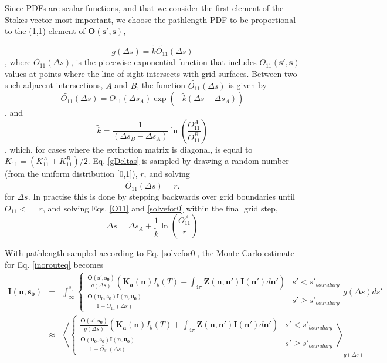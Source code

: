 Since PDFs are scalar functions, and that we consider the first element of the
Stokes vector most important, we choose the pathlength PDF to be proportional to the
(1,1) element of $\mathbf{O(s',s)}$,

\begin{equation}
g(\Delta s)=\tilde{k}\tilde{O_{11}}(\Delta s)
\label{gDeltas}
\end{equation}
, where $\tilde{O_{11}}(\Delta s)$, is the piecewise exponential
function that includes $O_{11}(\mathbf{s',s})$ values at points
where the line of sight intersects with grid surfaces.
Between two such adjacent intersections, $A$ and $B$, the function
$\tilde{O_{11}}(\Delta s)$ is given by
\begin{equation}
\tilde{O_{11}}(\Delta s)=O_{11}(\Delta s_A)\exp\left(-\tilde{k}\left(\Delta s-\Delta
s_A\right)\right)
\label{O11}
\end{equation}
, and
\begin{equation}
\tilde{k}=\frac{1}{\left(\Delta s_B-\Delta s_A\right)}
\ln\left(\frac{O_{11}^A}{O_{11}^B}\right)
\end{equation}
, which, for cases where the extinction matrix is diagonal, is equal to $K_{11}=(K_{11}^A+K_{11}^B)/2$.
Eq. \ref{gDeltas} is sampled by drawing a random number (from the uniform distribution [0,1]), $r$, and solving 
\begin{equation}
\tilde{O_{11}}(\Delta s)=r.
\label{solvefor0}
\end{equation}
for $\Delta s$.  In practise this is done by stepping backwards over
grid boundaries until $O_{11}<=r$, and solving Eqs. \ref{O11} and
\ref{solvefor0} within the final grid step,
\begin{equation}
\Delta s=\Delta s_A+\frac{1}{\tilde{k}}\ln\left(\frac{O_{11}^A}{r}\right)
\end{equation}

With pathlength sampled according to Eq. \ref{solvefor0}, the Monte
Carlo estimate for Eq. \ref{inorouteq} becomes
\begin{eqnarray}
\mathbf{I(n,s_0)}&=&\int^{s_0}_\infty\left\{\begin{array}{rl}
\frac{\mathbf{O(s',s_0)}}{g(\Delta s)}\left(\mathbf{K_a(n)}I_b(T)
+\int_{4\pi}\mathbf{Z(n,n')}\mathbf{I(n')}d\mathbf{n'}\right) & s'< s'_{boundary} \\
\frac{\mathbf{O(u_0,s_0)I(n,u_0)}}{1-\tilde{O_{11}}(\Delta s)} & s'\ge s'_{boundary}
\end{array}g(\Delta s)ds'\right.\nonumber\\
&\approx&\left\langle\left\{\begin{array}{rl}
\frac{\mathbf{O(s',s_0)}}{g(\Delta s)}\left(\mathbf{K_a(n)}I_b(T)
+\int_{4\pi}\mathbf{Z(n,n')}\mathbf{I(n')}d\mathbf{n'}\right) & s'< s'_{boundary} \\
\frac{\mathbf{O(u_0,s_0)I(n,u_0)}}{1-\tilde{O_{11}}(\Delta s)} & s'\ge s'_{boundary}
\end{array}\right.\right\rangle_{g(\Delta s)}
\label{pathlengthint}
\end{eqnarray} 

